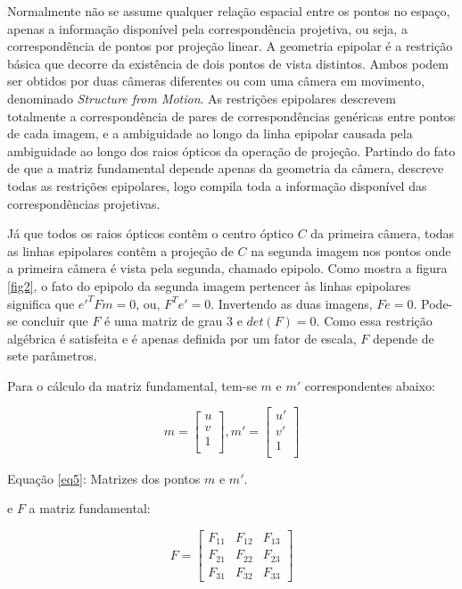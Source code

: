 Normalmente não se assume qualquer relação espacial entre os pontos no espaço, apenas a informação disponível pela correspondência projetiva, ou seja, a correspondência de pontos por projeção linear. A geometria epipolar é a restrição básica que decorre da existência de dois pontos de vista distintos. Ambos podem ser obtidos por duas câmeras diferentes ou com uma câmera em movimento, denominado \textit{Structure from Motion}. As restrições epipolares descrevem totalmente a correspondência de pares de correspondências genéricas entre pontos de cada imagem, e a ambiguidade ao longo da linha epipolar causada pela ambiguidade ao longo dos raios ópticos da operação de projeção. Partindo do fato de que a matriz fundamental depende apenas da geometria da câmera, descreve todas as restrições epipolares, logo compila toda a informação disponível das correspondências projetivas. 

Já que todos os raios ópticos contêm o centro óptico $C$ da primeira câmera, todas as linhas epipolares contêm a projeção de $C$ na segunda imagem nos pontos onde a primeira câmera é vista pela segunda, chamado epipolo. Como mostra a figura \ref{fig2}, o fato do epipolo da segunda imagem pertencer às linhas epipolares significa que $e'^{T}Fm = 0$, ou, $F^{T}e' = 0$. Invertendo as duas imagens, $Fe = 0$. Pode-se concluir que $F$ é uma matriz de grau 3 e $det(F) = 0$. Como essa restrição algébrica é satisfeita e é apenas definida por um fator de escala, $F$ depende de sete parâmetros.

Para o cálculo da matriz fundamental, tem-se $m$ e $m'$ correspondentes abaixo:

\begin{equation}\label{eq5}
m = \begin{bmatrix}u\\v\\1\\ \end{bmatrix}, 
m' = \begin{bmatrix}u'\\v'\\1\\ \end{bmatrix}
\end{equation}

Equação \eqref{eq5}: Matrizes dos pontos $m$ e $m'$.

e $F$ a matriz fundamental:

\begin{equation}\label{eq6}
F = 
\begin{bmatrix}
	F_{11} &  F_{12} &  F_{13}\\
	F_{21} &  F_{22} &  F_{23}\\
	F_{31} &  F_{32} &  F_{33}
\end{bmatrix}
\end{equation}

